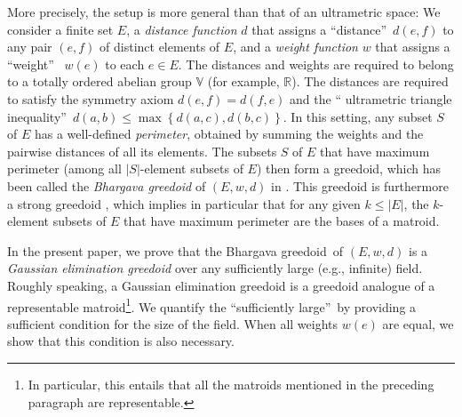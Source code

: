 \documentclass[numbers=enddot,12pt,final,onecolumn,notitlepage]{scrartcl}%
\theoremstyle{definition}
\renewcommand{\leq}{\leqslant}
\theoremstyle{plainsl}
\begin{document}
More precisely, the setup is more general than that of an ultrametric space:
We consider a finite set $E$, a \emph{distance function} $d$ that assigns a
\textquotedblleft distance\textquotedblright\ $d\left(  e,f\right)  $ to any
pair $\left(  e,f\right)  $ of distinct elements of $E$, and a \emph{weight
function} $w$ that assigns a \textquotedblleft weight\textquotedblright%
\ $w\left(  e\right)  $ to each $e\in E$. The distances and weights are
required to belong to a totally ordered abelian group $\mathbb{V}$ (for
example, $\mathbb{R}$). The distances are required to satisfy the symmetry
axiom $d\left(  e,f\right)  =d\left(  f,e\right)  $ and the \textquotedblleft
ultrametric triangle inequality\textquotedblright\ $d\left(  a,b\right)
\leq\max\left\{  d\left(  a,c\right)  ,d\left(  b,c\right)  \right\}  $. In
this setting, any subset $S$ of $E$ has a well-defined \emph{perimeter},
obtained by summing the weights and the pairwise distances of all its
elements. The subsets $S$ of $E$ that have maximum perimeter (among all
$\left\vert S\right\vert $-element subsets of $E$) then form a greedoid, which
has been called the \emph{Bhargava greedoid} of $\left(  E,w,d\right)  $ in
\cite{GriPet19}. This greedoid is furthermore a strong greedoid \cite[Theorem
6.1]{GriPet19}, which implies in particular that for any given $k\leq
\left\vert E\right\vert $, the $k$-element subsets of $E$ that have maximum
perimeter are the bases of a matroid.

In the present paper, we prove that the Bhargava greedoid\ of $\left(
E,w,d\right)  $ is a \emph{Gaussian elimination greedoid} over any
sufficiently large (e.g., infinite) field. Roughly speaking, a Gaussian
elimination greedoid is a greedoid analogue of a representable
matroid\footnote{In particular, this entails that all the matroids mentioned
in the preceding paragraph are representable.}. We quantify the
\textquotedblleft sufficiently large\textquotedblright\ by providing a
sufficient condition for the size of the field. When all weights $w\left(
e\right)  $ are equal, we show that this condition is also necessary.
\end{document}
